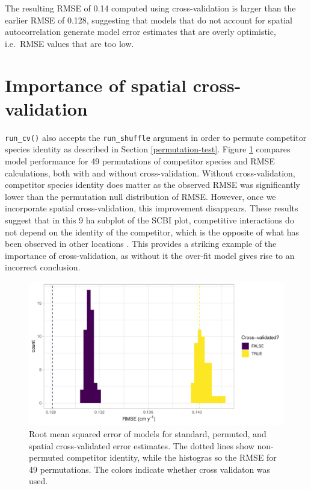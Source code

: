 \documentclass[12pt]{article}
\begin{document}
The resulting RMSE of 0.14 computed using cross-validation is larger
than the earlier RMSE of 0.128, suggesting that models that do not
account for spatial autocorrelation generate model error estimates that
are overly optimistic, i.e.~RMSE values that are too low.

\hypertarget{importance-of-spatial-cross-validation}{%
\section{Importance of spatial
cross-validation}\label{importance-of-spatial-cross-validation}}

\texttt{run\_cv()} also accepts the \texttt{run\_shuffle} argument in
order to permute competitor species identity as described in Section
\ref{permutation-test}. Figure \ref{fig:scbi-simulation} compares model
performance for 49 permutations of competitor species and RMSE
calculations, both with and without cross-validation. Without
cross-validation, competitor species identity does matter as the
observed RMSE was significantly lower than the permutation null
distribution of RMSE. However, once we incorporate spatial
cross-validation, this improvement disappears. These results suggest
that in this 9 ha subplot of the SCBI plot, competitive interactions do
not depend on the identity of the competitor, which is the opposite of
what has been observed in other locations \citep[
\citet{uriarte_spatially_2004}]{allen_permutation_2020}. This provides a
striking example of the importance of cross-validation, as without it
the over-fit model gives rise to an incorrect conclusion.

\begin{figure}

{\centering \includegraphics[width=1\linewidth]{simulation_results/2021-03-03_scbi_49_shuffles} 

}

\caption{Root mean squared error of models for standard, permuted, and spatial cross-validated error estimates. The dotted lines show non-permuted competitor identity, while the histogras so the RMSE for 49 permutations. The colors indicate whether cross validaton was used.}\label{fig:scbi-simulation}
\end{figure}
\end{document}
